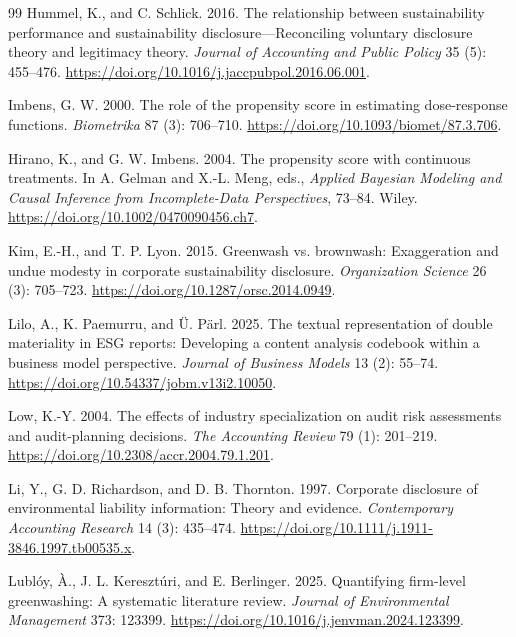 \documentclass[11pt]{article}
\begin{document}
\begin{thebibliography}{99}
Hummel, K., and C. Schlick. 2016.
The relationship between sustainability performance and sustainability disclosure---Reconciling voluntary disclosure theory and legitimacy theory.
\textit{Journal of Accounting and Public Policy} 35 (5): 455--476. \url{https://doi.org/10.1016/j.jaccpubpol.2016.06.001}.

Imbens, G. W. 2000.
The role of the propensity score in estimating dose-response functions.
\textit{Biometrika} 87 (3): 706--710. \url{https://doi.org/10.1093/biomet/87.3.706}.

Hirano, K., and G. W. Imbens. 2004.
The propensity score with continuous treatments.
In A. Gelman and X.-L. Meng, eds., \textit{Applied Bayesian Modeling and Causal Inference from Incomplete-Data Perspectives}, 73--84. Wiley. \url{https://doi.org/10.1002/0470090456.ch7}.

Kim, E.-H., and T. P. Lyon. 2015.
Greenwash vs. brownwash: Exaggeration and undue modesty in corporate sustainability disclosure.
\textit{Organization Science} 26 (3): 705--723. \url{https://doi.org/10.1287/orsc.2014.0949}.

Lilo, A., K. Paemurru, and Ü. Pärl. 2025.
The textual representation of double materiality in ESG reports: Developing a content analysis codebook within a business model perspective.
\textit{Journal of Business Models} 13 (2): 55--74. \url{https://doi.org/10.54337/jobm.v13i2.10050}.

Low, K.-Y. 2004.
The effects of industry specialization on audit risk assessments and audit-planning decisions.
\textit{The Accounting Review} 79 (1): 201--219. \url{https://doi.org/10.2308/accr.2004.79.1.201}.

Li, Y., G. D. Richardson, and D. B. Thornton. 1997.
Corporate disclosure of environmental liability information: Theory and evidence.
\textit{Contemporary Accounting Research} 14 (3): 435--474. \url{https://doi.org/10.1111/j.1911-3846.1997.tb00535.x}.

Lubl\'oy, \`A., J. L. Kereszt\'uri, and E. Berlinger. 2025.
Quantifying firm-level greenwashing: A systematic literature review.
\textit{Journal of Environmental Management} 373: 123399. \url{https://doi.org/10.1016/j.jenvman.2024.123399}.


\end{thebibliography}
\end{document}

